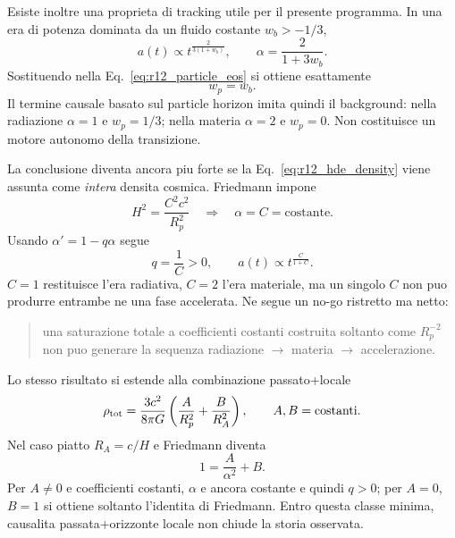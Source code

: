 \documentclass[11pt,a4paper]{article}
\begin{document}
Esiste inoltre una proprieta di tracking utile per il presente programma. In una era di potenza dominata da un fluido costante $w_b>-1/3$,
\begin{equation}
 a(t)\propto t^{\frac{2}{3(1+w_b)}},
 \qquad
 \alpha=\frac{2}{1+3w_b}.
\end{equation}
Sostituendo nella Eq.~\eqref{eq:r12_particle_eos} si ottiene esattamente
\begin{equation}
 \boxed{w_p=w_b}.
\end{equation}
Il termine causale basato sul particle horizon imita quindi il background: nella radiazione $\alpha=1$ e $w_p=1/3$; nella materia $\alpha=2$ e $w_p=0$. Non costituisce un motore autonomo della transizione.

La conclusione diventa ancora piu forte se la Eq.~\eqref{eq:r12_hde_density} viene assunta come \emph{intera} densita cosmica. Friedmann impone
\begin{equation}
 H^2=\frac{C^2c^2}{R_p^2}
 \quad\Longrightarrow\quad
 \boxed{\alpha=C=\mathrm{costante}}.
\end{equation}
Usando $\alpha'=1-q\alpha$ segue
\begin{equation}
 \boxed{q=\frac1C>0},
 \qquad
 \boxed{a(t)\propto t^{\frac{C}{1+C}}}.
 \label{eq:r12_particle_total_power}
\end{equation}
$C=1$ restituisce l'era radiativa, $C=2$ l'era materiale, ma un singolo $C$ non puo produrre entrambe ne una fase accelerata. Ne segue un no-go ristretto ma netto:
\begin{quote}
una saturazione totale a coefficienti costanti costruita soltanto come $R_p^{-2}$ non puo generare la sequenza radiazione $\rightarrow$ materia $\rightarrow$ accelerazione.
\end{quote}

Lo stesso risultato si estende alla combinazione passato+locale
\begin{equation}
 \rho_{\rm tot}=\frac{3c^2}{8\pi G}
 \left(\frac{A}{R_p^2}+\frac{B}{R_A^2}\right),
 \qquad A,B=\mathrm{costanti}.
\end{equation}
Nel caso piatto $R_A=c/H$ e Friedmann diventa
\begin{equation}
 1=\frac{A}{\alpha^2}+B.
\end{equation}
Per $A\neq0$ e coefficienti costanti, $\alpha$ e ancora costante e quindi $q>0$; per $A=0$, $B=1$ si ottiene soltanto l'identita di Friedmann. Entro questa classe minima, causalita passata+orizzonte locale non chiude la storia osservata.
\end{document}

